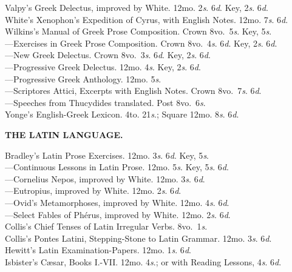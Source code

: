 \documentclass[letterpaper,12pt,oneside,openany]{memoir}
\newcommand{\E}{\hspace*{2mm}---\hspace*{2mm}}
\begin{document}
\begin{footnotesize}
Valpy's Greek Delectus, improved by White. 12mo. 2\textit{s}. 6\textit{d}. Key, 2\textit{s}. 6\textit{d}.\\
White's Xenophon's Expedition of Cyrus, with English Notes. 12mo. 7\textit{s}. 6\textit{d}.\\
Wilkins's Manual of Greek Prose Composition. Crown 8vo.\ 5\textit{s}. Key, 5\textit{s}.\\
\E Exercises in Greek Prose Composition. Crown 8vo.\ 4\textit{s}. 6\textit{d}. Key, 2\textit{s}. 6\textit{d}.\\
\E New Greek Delectus. Crown 8vo.\ 3\textit{s}. 6\textit{d}. Key, 2\textit{s}. 6\textit{d}.\\
\E Progressive Greek Delectus. 12mo. 4\textit{s}. Key, 2\textit{s}. 6\textit{d}.\\
\E Progressive Greek Anthology. 12mo. 5\textit{s}.\\
\E Scriptores Attici, Excerpts with English Notes. Crown 8vo.\ 7\textit{s}. 6\textit{d}.\\
\E Speeches from Thucydides translated. Post 8vo.\ 6\textit{s}.\\
Yonge's English-Greek Lexicon. 4to. 21\textit{s}.; Square 12mo. 8\textit{s}. 6\textit{d}.
\begin{center}
\textbf{THE LATIN LANGUAGE.}
\end{center}
Bradley's Latin Prose Exercises. 12mo. 3\textit{s}. 6\textit{d}. Key, 5\textit{s}.\\
\E Continuous Lessons in Latin Prose. 12mo. 5\textit{s}. Key, 5\textit{s}. 6\textit{d}.\\
\E Cornelius Nepos, improved by White. 12mo. 3\textit{s}. 6\textit{d}.\\
\E Eutropius, improved by White. 12mo. 2\textit{s}. 6\textit{d}.\\
\E Ovid's Metamorphoses, improved by White. 12mo. 4\textit{s}. 6\textit{d}.\\
\E Select Fables of Ph{\'e}rus, improved by White. 12mo. 2\textit{s}. 6\textit{d}.\\
Collis's Chief Tenses of Latin Irregular Verbs. 8vo.\ 1\textit{s}.\\
Collis's Pontes Latini, Stepping-Stone to Latin Grammar. 12mo. 3\textit{s}. 6\textit{d}.\\
Hewitt's Latin Examination-Papers. 12mo. 1\textit{s}. 6\textit{d}.\\
Isbister's C{\ae}sar, Books I.-VII. 12mo. 4\textit{s}.; or with Reading Lessons, 4\textit{s}. 6\textit{d}.\\

\end{footnotesize}
\end{document}
